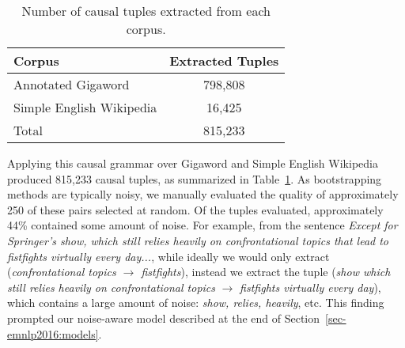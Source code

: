 
\begin{table}[t!]
\begin{center}
\begin{footnotesize}
\begin{tabular}{lc}
\hline
Corpus		&	Extracted Tuples		 \\
\hline
Annotated Gigaword	& 798,808 	\\
Simple English Wikipedia		& 16,425 	\\
\hline
Total		& 815,233 	\\
\end{tabular}
\end{footnotesize}
\caption{{\footnotesize Number of causal tuples extracted from each corpus.}} 
\label{tab:causalstats}
\end{center}
\end{table}


Applying this causal grammar over Gigaword and Simple English Wikipedia produced %
815,233 causal tuples, as summarized in Table~\ref{tab:causalstats}. As bootstrapping methods are typically noisy, we manually evaluated the quality of approximately 250 of these pairs selected at random.  Of the tuples evaluated, approximately 44\% contained some amount of noise. For example, from the sentence \emph{Except for Springer's show, which still relies heavily on confrontational topics that lead to fistfights virtually every day...}, while ideally we would only extract (\emph{confrontational topics $\rightarrow$ fistfights}), instead we extract the tuple (\emph{show which still relies heavily on confrontational topics} $\rightarrow$ \emph{fistfights virtually every day}), which contains a large amount of noise: \emph{show, relies, heavily}, etc.
This finding prompted our noise-aware model described at the end of Section~\ref{sec-emnlp2016:models}.



